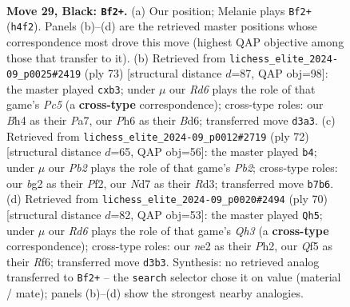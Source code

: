 \documentclass[11pt]{article}
\begin{document}
\clearpage

\begin{figure}[p]\centering
\begin{subfigure}{0.46\textwidth}\centering
\resizebox{\linewidth}{!}{%
\newchessgame
\chessboard[
  setfen={2Q5/pp1n2kp/7p/1P3q2/3P3b/3r4/4N1B1/R5KR b - - 5 29},
  showmover=false,
  pgfstyle=straightmove, color=movearrow, markmove={h4-f2}
]}
\caption{}
\end{subfigure}\hfill
\begin{subfigure}{0.46\textwidth}\centering
\resizebox{\linewidth}{!}{%
\newchessgame
\chessboard[
  setfen={8/p4pk1/3bp3/8/2p5/1PP1q1nR/P4pQ1/KN6 b - - 0 37},
  showmover=false,
  pgfstyle=straightmove, color=movearrow, markmove={c4-b3}
]}
\caption{}
\end{subfigure}
\\[4pt]
\begin{subfigure}{0.46\textwidth}\centering
\resizebox{\linewidth}{!}{%
\newchessgame
\chessboard[
  setfen={5rk1/Q6p/4p1p1/1qN3r1/3p4/3R1P2/PP3P1P/5K2 w - - 3 37},
  showmover=false,
  pgfstyle=straightmove, color=movearrow, markmove={b2-b4}
]}
\caption{}
\end{subfigure}\hfill
\begin{subfigure}{0.46\textwidth}\centering
\resizebox{\linewidth}{!}{%
\newchessgame
\chessboard[
  setfen={1k2r3/pp1b4/3pNR2/2p5/P7/2PK3Q/q6P/8 w - - 4 36},
  showmover=false,
  pgfstyle=straightmove, color=movearrow, markmove={h3-h5}
]}
\caption{}
\end{subfigure}
\caption{\textbf{Move 29, Black: \texttt{Bf2+}.} (a) Our position; Melanie plays \texttt{Bf2+} (\texttt{h4f2}). Panels (b)--(d) are the retrieved master positions whose correspondence most drove this move (highest QAP objective among those that transfer to it). (b) Retrieved from \texttt{lichess\_elite\_2024-09\_p0025\#2419} (ply 73) [structural distance $d$=87, QAP obj=98]: the master played \texttt{cxb3}; under $\mu$ our \emph{Rd6} plays the role of that game's \emph{Pc5} (a \textbf{cross-type} correspondence); cross-type roles: our \emph{B}h4 as their \emph{P}a7, our \emph{P}h6 as their \emph{B}d6; transferred move \texttt{d3a3}. (c) Retrieved from \texttt{lichess\_elite\_2024-09\_p0012\#2719} (ply 72) [structural distance $d$=65, QAP obj=56]: the master played \texttt{b4}; under $\mu$ our \emph{Pb2} plays the role of that game's \emph{Pb2}; cross-type roles: our \emph{b}g2 as their \emph{P}f2, our \emph{N}d7 as their \emph{R}d3; transferred move \texttt{b7b6}. (d) Retrieved from \texttt{lichess\_elite\_2024-09\_p0020\#2494} (ply 70) [structural distance $d$=82, QAP obj=53]: the master played \texttt{Qh5}; under $\mu$ our \emph{Rd6} plays the role of that game's \emph{Qh3} (a \textbf{cross-type} correspondence); cross-type roles: our \emph{n}e2 as their \emph{P}h2, our \emph{Q}f5 as their \emph{R}f6; transferred move \texttt{d3b3}. Synthesis: no retrieved analog transferred to \texttt{Bf2+} -- the \texttt{search} selector chose it on value (material / mate); panels (b)--(d) show the strongest nearby analogies.}
\label{fig:thought-m57}
\end{figure}
\end{document}
